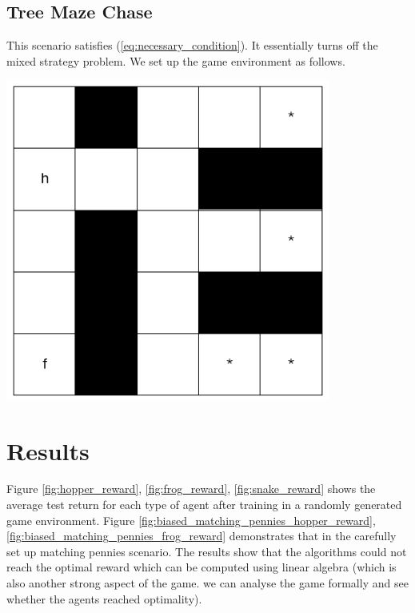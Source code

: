 \documentclass[a4paper]{article}
\begin{document}
\begin{multicols}{2}
\subsection{Tree Maze Chase}
This scenario satisfies (\ref{eq:necessary_condition}). It essentially turns off the mixed strategy problem. We set up the game environment as follows.

\noindent
\begin{minipage}{\columnwidth}
\centering
\includegraphics[width=0.8\textwidth]{images/tree_maze_chase.png}
\label{fig:tree_maze_chase}
\end{minipage}

\section{Results}
Figure \ref{fig:hopper_reward}, \ref{fig:frog_reward}, \ref{fig:snake_reward} shows the average test return for each type of agent after training in a randomly generated game environment. Figure \ref{fig:biased_matching_pennies_hopper_reward}, \ref{fig:biased_matching_pennies_frog_reward} demonstrates that in the carefully set up matching pennies scenario. The results show that the algorithms could not reach the optimal reward which can be computed using linear algebra (which is also another strong aspect of the game. we can analyse the game formally and see whether the agents reached optimality).

\noindent
\begin{minipage}{\columnwidth}
\centering

\label{fig:hopper_reward}
\end{minipage}


\end{multicols}
\end{document}
